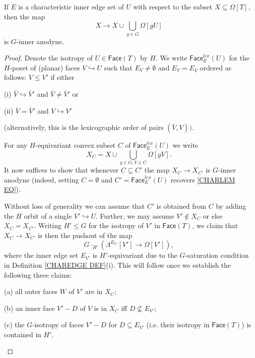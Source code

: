 \documentclass[a4paper,10pt,draft]{article}%
\numberwithin{equation}{section}%
\numberwithin{figure}{section}
\begin{document}
\begin{lemma}\label{CHAREDGE LEM}
If $E$ is a characteristic inner edge set of $U$ with respect to the subset $X \subseteq \Omega[T]$, then the map
\begin{equation}\label{CHARLEM EQ}
	X \to X \cup \bigcup_{g\in G} \Omega[gU]
\end{equation}
is $G$-inner anodyne.
\end{lemma}

\begin{proof}Denote the isotropy of $U\in \mathsf{Face}(T)$ by $H$.
	We write 
	$\mathsf{Face}_{E}^{lex}(U)$
	for the $H$-poset of (planar) faces $V \hookrightarrow U$
	such that $E_V \neq \emptyset$ and $E_V = E_{\bar{V}}$
	ordered as follows: 
	$V \leq V'$ if either 
	\begin{inparaenum}
		\item[(i)] $\bar{V} \hookrightarrow \bar{V}'$ and 
		$\bar{V} \neq \bar{V}'$ or
		\item[(ii)] $\bar{V} = \bar{V}'$ and
		$V \hookrightarrow V'$
	\end{inparaenum}
(alternatively, this is the lexicographic order of pairs $(\bar{V},V))$.

For any $H$-equivariant convex subset $C$ of $\mathsf{Face}_{E}^{lex}(U)$ we write
\[
X_C = 
X \cup \bigcup_{g\in G,V \in C} \Omega[gV].
\]
It now suffices to show that whenever
$C \subseteq C'$
the map 
$X_C \to X_{C'}$ is $G$-inner anodyne
(indeed, setting $C=\emptyset$ and $C'=\mathsf{Face}_{E}^{lex}(U)$ recovers \eqref{CHARLEM EQ}).

Without loss of generality we can assume that $C'$ is obtained from $C$ by adding the $H$ orbit of a single $V' \hookrightarrow U$. Further, we may assume $V' \not \in X_C$ or else $X_C=X_{C'}$.
Writing $H' \leq G$ for the isotropy of $V'$ in $\mathsf{Face}(T)$, we claim that $X_C \to X_{C'}$ is then the pushout of the map
\[
	G \cdot_{H'} 
	\left( \Lambda^{E_{V'}}[V'] \to \Omega[V'] \right),
\]
where the inner edge set $E_{V'}$ is $H'$-equivariant due to the $G$-saturation condition in 
Definition \ref{CHAREDGE DEF}(i).
This will follow once we establish the following three claims:
\begin{inparaenum}
\item[(a)] all outer faces $W$ of $V'$ are in $X_C$;
\item[(b)] an inner face $V' - D$ of $V$ is in $X_C$ iff 
$D \not \subseteq E_{V'}$;
\item[(c)] the $G$-isotropy of faces $V' - D$ for 
$D \subseteq E_{V'}$ 
(i.e. their isotropy in $\mathsf{Face}(T)$)
is contained in $H'$.
\end{inparaenum}


\end{proof}
\end{document}
